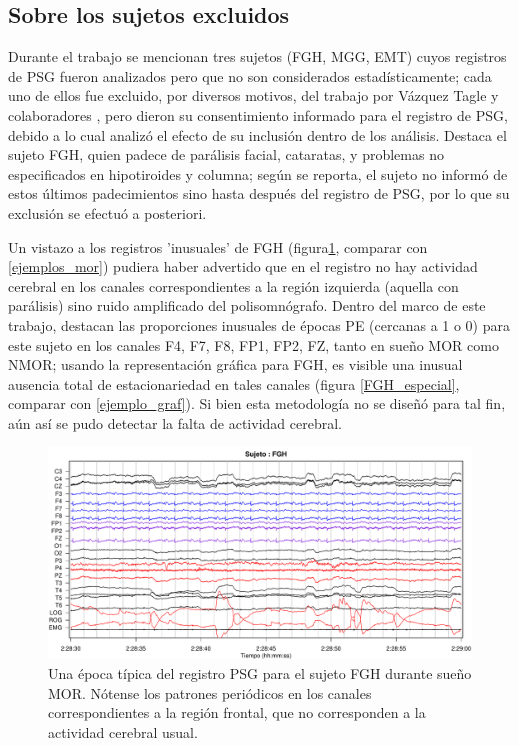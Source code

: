 
\subsection{Sobre los sujetos excluidos}

Durante el trabajo se mencionan tres sujetos (FGH, MGG, EMT) cuyos registros de PSG fueron 
analizados pero que no son considerados estadísticamente; cada uno de ellos fue excluido, por 
diversos motivos, del trabajo por Vázquez Tagle y colaboradores \cite{VazquezTagle16}, pero 
dieron su consentimiento informado para el registro de PSG, debido a lo cual analizó el efecto de 
su inclusión dentro de los análisis.
Destaca el sujeto FGH, quien padece de parálisis facial, cataratas, y problemas no especificados 
en hipotiroides y columna; según se reporta, el sujeto no informó de estos últimos 
padecimientos sino hasta después del registro de PSG, por lo que su exclusión se efectuó a 
posteriori.

Un vistazo a los registros 'inusuales' de FGH (figura\ref{FGH_psg}, comparar con 
\ref{ejemplos_mor}) pudiera haber advertido que en el registro no hay actividad cerebral en los 
canales correspondientes a la región izquierda (aquella con parálisis) sino ruido amplificado 
del polisomnógrafo.
Dentro del marco de este trabajo, destacan las proporciones inusuales de épocas PE (cercanas a 1 
o 0) para este sujeto en los canales F4, F7, F8, FP1, FP2, FZ, tanto en sueño MOR como NMOR; 
usando la representación gráfica para FGH, es visible una inusual ausencia total de 
estacionariedad en tales canales (figura \ref{FGH_especial}, comparar con \ref{ejemplo_graf}). 
Si bien esta metodología no se diseñó para tal fin, aún así se pudo detectar la falta de 
actividad cerebral.

\begin{figure}
\centering
\includegraphics[width=0.95\linewidth]
{./img_ejemplos/FGH_297_PDG_lucirse_PSG.pdf} 
\caption{Una época típica del registro PSG para el sujeto FGH durante sueño MOR. Nótense 
los patrones periódicos en los canales correspondientes a la región frontal, que no 
corresponden a la actividad cerebral usual.}
\label{FGH_psg}
\end{figure}


